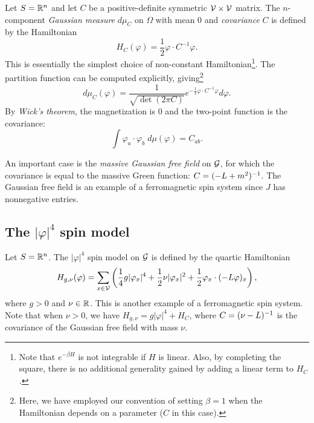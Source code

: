 Let $S = {\mathbb R}^n$ and let $C$ be a positive-definite symmetric $\mathcal{V}\times\mathcal{V}$ matrix. The $n$-component \emph{Gaussian measure} $d\mu_C$ on
$\Omega$ with mean $0$ and \emph{covariance} $C$ is defined by the Hamiltonian
\begin{equation}
H_C(\varphi) = \frac{1}{2} \varphi \cdot C^{-1} \varphi.
\end{equation}
This is essentially the simplest choice of non-constant
Hamiltonian\footnote{Note that $e^{-\beta H}$ is not integrable if $H$ is linear. Also, by completing the square, there is no additional generality gained by adding a linear term to $H_C$.}.
The partition function can be computed explicitly, giving\footnote{Here, we have employed our convention of setting $\beta = 1$ when the Hamiltonian depends on a parameter ($C$ in this case).}
\begin{equation}
d\mu_C(\varphi)
  =
\frac{1}{\sqrt{\det(2\pi C)}} e^{-\frac{1}{2} \varphi\cdot C^{-1}\varphi} d\varphi.
\end{equation}
By \emph{Wick's theorem}, the magnetization is $0$ and the two-point function is the covariance:
\begin{equation}
\int \varphi_a \cdot \varphi_b \; d\mu(\varphi) = C_{ab}.
\end{equation}

An important case is the \emph{massive Gaussian free field} on $\mathcal{G}$, for which the covariance is equal to the massive Green function:
$C = (-L + m^2)^{-1}$. The Gaussian free field is an example of a ferromagnetic spin system since $J$ has nonnegative entries.


\subsection{The \texorpdfstring{$|\varphi|^4$}{phi4} spin model}

Let $S = {\mathbb R}^n$. The $|\varphi|^4$ spin model on $\mathcal{G}$ is defined by the quartic Hamiltonian
\begin{equation}
H_{g,\nu}(\varphi)
  =
\sum_{x\in\mathcal{V}}
\left(
  \frac{1}{4} g |\varphi_x|^4
    +
  \frac{1}{2} \nu |\varphi_x|^2
    +
  \frac{1}{2} \varphi_x \cdot (-L \varphi)_x
\right),
\end{equation}
where $g > 0$ and $\nu\in{\mathbb R}$. This is another example of a ferromagnetic spin system. Note that when $\nu > 0$, we have
$H_{g,\nu} = g |\varphi|^4 + H_C$, where $C = (\nu - L)^{-1}$ is the covariance of the Gaussian free field with mass $\nu$.

